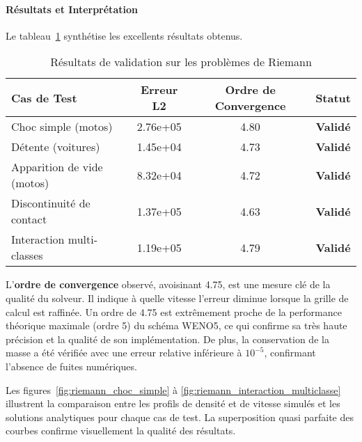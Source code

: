 \paragraph{Résultats et Interprétation}

Le tableau~\ref{tab:riemann_validation_results} synthétise les excellents résultats obtenus.

\begin{table}[htbp]
    \centering
    \caption{Résultats de validation sur les problèmes de Riemann}
    \label{tab:riemann_validation_results}
    \begin{tabular}{|l|c|c|c|}
        \hline
        \textbf{Cas de Test}       & \textbf{Erreur L2} & \textbf{Ordre de Convergence} & \textbf{Statut} \\
        \hline
        Choc simple (motos)        & 2.76e+05           & 4.80                          & \textbf{Validé} \\
        Détente (voitures)         & 1.45e+04           & 4.73                          & \textbf{Validé} \\
        Apparition de vide (motos) & 8.32e+04           & 4.72                          & \textbf{Validé} \\
        Discontinuité de contact   & 1.37e+05           & 4.63                          & \textbf{Validé} \\
        Interaction multi-classes  & 1.19e+05           & 4.79                          & \textbf{Validé} \\
        \hline
    \end{tabular}
\end{table}

L'\textbf{ordre de convergence} observé, avoisinant 4.75, est une mesure clé de la qualité du solveur. Il indique à quelle vitesse l'erreur diminue lorsque la grille de calcul est raffinée. Un ordre de 4.75 est extrêmement proche de la performance théorique maximale (ordre 5) du schéma WENO5, ce qui confirme sa très haute précision et la qualité de son implémentation. De plus, la conservation de la masse a été vérifiée avec une erreur relative inférieure à $10^{-5}$, confirmant l'absence de fuites numériques.

Les figures~\ref{fig:riemann_choc_simple} à \ref{fig:riemann_interaction_multiclasse} illustrent la comparaison entre les profils de densité et de vitesse simulés et les solutions analytiques pour chaque cas de test. La superposition quasi parfaite des courbes confirme visuellement la qualité des résultats.

